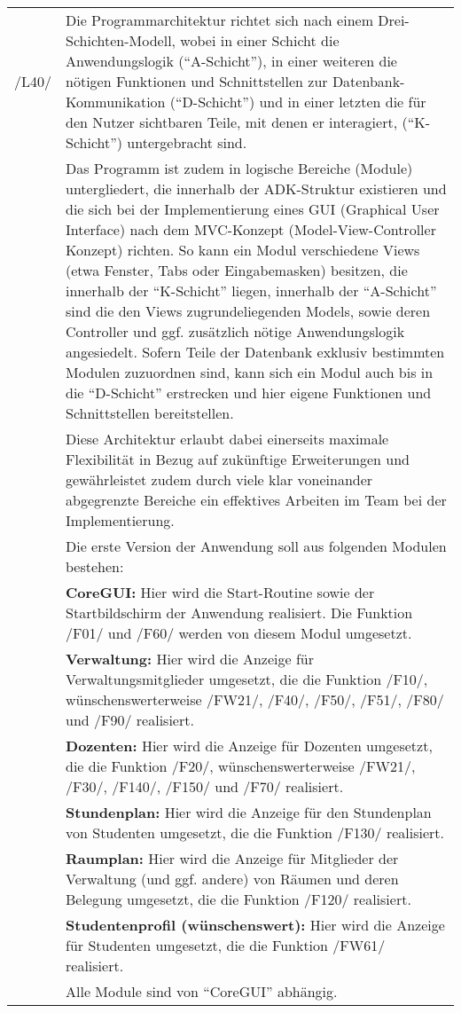 \begin{tabular}{p{1.5cm}p{14.5cm}}
						
	 /L40/	& Die Programmarchitektur richtet sich nach einem Drei-Schichten-Modell, wobei in einer Schicht die Anwendungslogik ("`A-Schicht"'), in einer weiteren die nötigen Funktionen und Schnittstellen zur Datenbank-Kommunikation ("`D-Schicht"') und in einer letzten die für den Nutzer sichtbaren Teile, mit denen er interagiert, ("`K-Schicht"') untergebracht sind.\\
	 & Das Programm ist zudem in logische Bereiche (Module) untergliedert, die innerhalb der ADK-Struktur existieren und die sich bei der Implementierung eines GUI (Graphical User Interface) nach dem MVC-Konzept (Model-View-Controller Konzept) richten. So kann ein Modul verschiedene Views (etwa Fenster, Tabs oder Eingabemasken) besitzen, die innerhalb der "`K-Schicht"' liegen, innerhalb der "`A-Schicht"' sind die den Views zugrundeliegenden Models, sowie deren Controller und ggf. zusätzlich nötige Anwendungslogik angesiedelt. Sofern Teile der Datenbank exklusiv bestimmten Modulen zuzuordnen sind, kann sich ein Modul auch bis in die "`D-Schicht"' erstrecken und hier eigene Funktionen und Schnittstellen bereitstellen. \\
	 & Diese Architektur erlaubt dabei einerseits maximale Flexibilität in Bezug auf zukünftige Erweiterungen und gewährleistet zudem durch viele klar voneinander abgegrenzte Bereiche ein effektives Arbeiten im Team bei der Implementierung. \\[0.15cm]
	 &	Die erste Version der Anwendung soll aus folgenden Modulen bestehen: \\[0.15cm]
	 &	\textbf{CoreGUI:} Hier wird die Start-Routine sowie der Startbildschirm der Anwendung realisiert. Die Funktion /F01/ und /F60/ werden von diesem Modul umgesetzt.\\[0.15cm]
	 &	\textbf{Verwaltung:} Hier wird die Anzeige für Verwaltungsmitglieder umgesetzt, die die Funktion /F10/, wünschenswerterweise /FW21/, /F40/, /F50/, /F51/, /F80/ und /F90/ realisiert.\\[0.15cm]
	 &	\textbf{Dozenten:} Hier wird die Anzeige für Dozenten umgesetzt, die die Funktion /F20/, wünschenswerterweise /FW21/, /F30/, /F140/, /F150/ und /F70/ realisiert.\\[0.15cm]
	 &	\textbf{Stundenplan:} Hier wird die Anzeige für den Stundenplan von Studenten umgesetzt, die die Funktion /F130/ realisiert.\\
	 &	\textbf{Raumplan:} Hier wird die Anzeige für Mitglieder der Verwaltung (und ggf. andere) von Räumen und deren Belegung umgesetzt, die die Funktion /F120/ realisiert.\\[0.15cm]
	 &	\textbf{Studentenprofil (wünschenswert):} Hier wird die Anzeige für Studenten umgesetzt, die die Funktion /FW61/ realisiert.\\[0.15cm]
	 & Alle Module sind von "`CoreGUI"' abhängig.\\[0.25cm]

\end{tabular}


